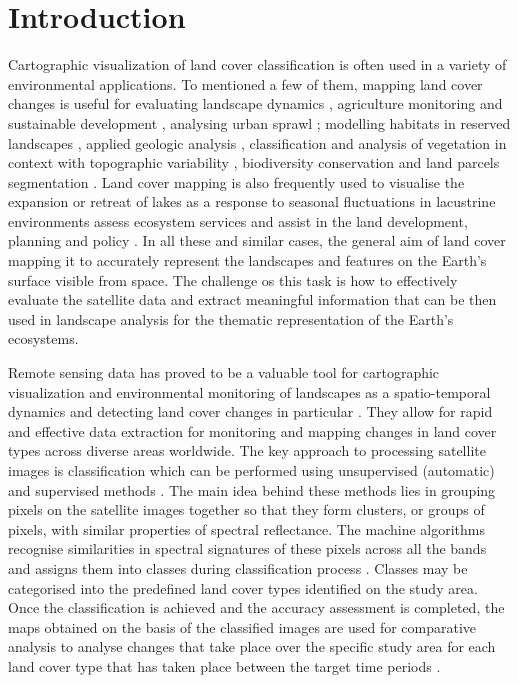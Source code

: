 \documentclass[final,5p,times,twocolumn]{elsarticle}
\begin{document}
\section{Introduction}

Cartographic visualization of land cover classification is often used in a variety of environmental applications. To mentioned a few of them, mapping land cover changes is useful for evaluating landscape dynamics \cite{HUANG20201039,DU2024168593,ZHAI2023110734}, agriculture monitoring and sustainable development \cite{CHEN2024111488,Qiuetal2003,info14040249,CHENG20231190}, analysing urban sprawl \cite{DING2022103001,ZHANG2023113801,ZHANG2022109715}; modelling habitats in reserved landscapes \cite{WEN2024}, applied geologic analysis \cite{LI2024100056}, classification and analysis of vegetation in context with topographic variability \cite{Lemenkova2022}, biodiversity conservation \cite{JIN2022108981,LUO2024111325} and land parcels segmentation \cite{LIU2023103265,Lemenkova202320}. Land cover mapping is also frequently used to visualise the expansion or retreat of lakes as a response to seasonal fluctuations in lacustrine environments \cite{ZhangGuoqingetal,Lemenkova202322,Lemenkova202313} assess ecosystem services \cite{Wei,Pasquarella} and assist in the land development, planning and policy \cite{Song}. In all these and similar cases, the general aim of land cover mapping it to accurately represent the landscapes and features on the Earth's surface visible from space. The challenge os this task is how to effectively evaluate the satellite data and extract meaningful information that can be then used  in landscape analysis for the thematic representation of the Earth's ecosystems.

Remote sensing data has proved to be a valuable tool for cartographic visualization and environmental monitoring of landscapes as a spatio-temporal dynamics \cite{Wangetal2016,Shaoetal2008,Lemenkova202324,FASSNACHT2015115,Lemenkova202310,LIU2021102481} and detecting land cover changes in particular \cite{Kulkarni_Bahuguna_2002,jmse11040871}. They allow for rapid and effective data extraction for monitoring and mapping changes in land cover types across diverse areas worldwide. The key approach to processing satellite images is classification which can be performed using unsupervised (automatic) and supervised methods \cite{LI2023129285,Lemenkova202229,LI2020111915}. The main idea behind these methods lies in grouping pixels on the satellite images together so that they form clusters, or groups of pixels, with similar properties of spectral reflectance. The machine algorithms recognise similarities in spectral signatures of these pixels across all the bands and assigns them into classes during classification process \cite{LI2023103351,Lemenkova202321}. Classes may be categorised into the predefined land cover types identified on the study area. Once the classification is achieved and the accuracy assessment is completed, the maps obtained on the basis of the classified images are used for comparative analysis to analyse changes that take place over the specific study area for each land cover type that has taken place between the target time periods \cite{CHEN2007298,Lemenkova202323,LIU2021104942}.
\end{document}
